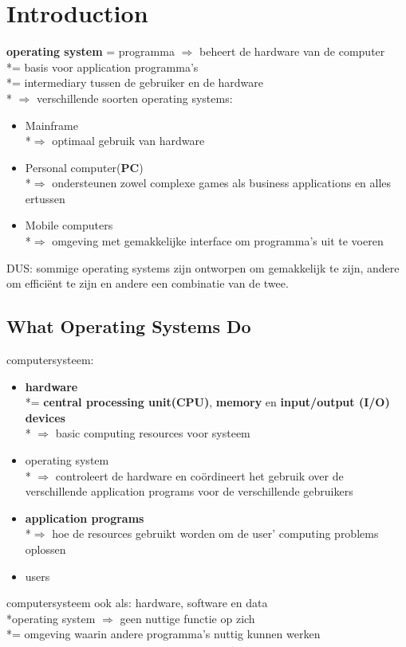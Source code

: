 \documentclass{report}
\begin{document}
\chapter{Introduction}
\textbf{operating system} = programma $\Rightarrow$ beheert de hardware van de computer
\\*= basis voor application programma's
\\*= intermediary tussen de gebruiker en de hardware
\\* $\Rightarrow$ verschillende soorten operating systems:
\begin{itemize}
	\item Mainframe 
	\\*$\Rightarrow$ optimaal gebruik van hardware
	\item Personal computer(\textbf{PC})
	\\*$\Rightarrow$ ondersteunen zowel complexe games als business 		applications en alles ertussen
	\item Mobile computers
	\\*$\Rightarrow$ omgeving met gemakkelijke interface om programma's uit te voeren
\end{itemize}
DUS: sommige operating systems zijn ontworpen om gemakkelijk te zijn, andere om effici\"ent te zijn en andere een combinatie van de twee.

\section{What Operating Systems Do}
computersysteem:
\begin {itemize}
	\item \textbf{hardware}
	\\*= \textbf{central processing unit(CPU)}, \textbf{memory} en \textbf{input/output (I/O) devices}
	\\* $\Rightarrow$ basic computing resources voor systeem
	\item operating system
	\\* $\Rightarrow$ controleert de hardware en co\"ordineert het gebruik over de verschillende application programs voor de verschillende gebruikers
	\item \textbf{application programs}
	\\*$\Rightarrow$ hoe de resources gebruikt worden om de user' computing problems oplossen
	\item users
\end {itemize}
computersysteem ook als: hardware, software en data
\\*operating system $\Rightarrow$ geen nuttige functie op zich
\\*= omgeving waarin andere programma's nuttig kunnen werken
\end{document}
